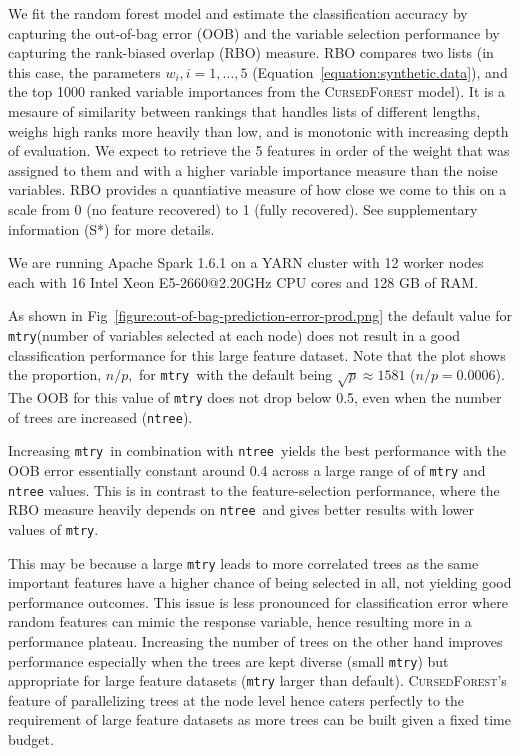 \documentclass[10pt,letterpaper]{article}
\newcommand{\cursedforest}{\textsc{CursedForest}\xspace}
\newcommand{\mtry}{\texttt{mtry}\xspace}
\newcommand{\ntree}{\texttt{ntree}\xspace}
\begin{document}
We fit the random forest model and estimate the classification accuracy by capturing the out-of-bag error (OOB) and the
variable selection performance by capturing the rank-biased overlap (RBO) \cite{Webber2010} measure. RBO compares two
lists (in this case, the parameters $w_i, i=1,\ldots , 5$ (Equation~\ref{equation:synthetic.data}), and the top 1000
ranked variable importances from the \cursedforest model). It is a mesaure of similarity between rankings that handles
lists of different lengths, weighs high ranks more heavily than low, and is monotonic with increasing depth of
evaluation. We expect to retrieve the 5 features in order of the weight that was assigned to them and with a higher
variable importance measure than the noise variables. RBO provides a quantiative measure of how close we come to this on
a scale from 0 (no feature recovered) to 1 (fully recovered). See supplementary information (S*) for more details.

We are running Apache Spark 1.6.1 on a YARN
cluster with 12 worker nodes each with 16 Intel Xeon E5-2660@2.20GHz CPU cores and 128 GB of RAM.



As shown in Fig~\ref{figure:out-of-bag-prediction-error-prod.png} the default value for \mtry (number of variables
selected at each node) does not result in a good classification performance for this large feature dataset. Note that
the plot shows the proportion, $n/p,$ for \mtry\ with the default being $\sqrt{p} \approx 1581$ ($n/p=0.0006$).  The
OOB for this value of \mtry does not drop below 0.5, even when the number of trees are increased (\ntree).

Increasing \mtry\ in combination with \ntree\ yields the best performance with the OOB error essentially constant around 0.4
across a large range of of \mtry and \ntree values.  This is in contrast to the feature-selection performance, where the
RBO measure heavily depends on \ntree\ and gives better results with lower values of \mtry.

This may be because a large \mtry leads to more correlated trees as the same important features have a higher chance of
being selected in all, not yielding good performance outcomes.  This issue is less pronounced for classification error
where random features can mimic the response variable, hence resulting more in a performance plateau.  Increasing the
number of trees on the other hand improves performance especially when the trees are kept diverse (small \mtry) but
appropriate for large feature datasets (\mtry larger than default). \cursedforest's feature of parallelizing trees at
the node level hence caters perfectly to the requirement of large feature datasets as more trees can be built given a
fixed time budget.
\end{document}

